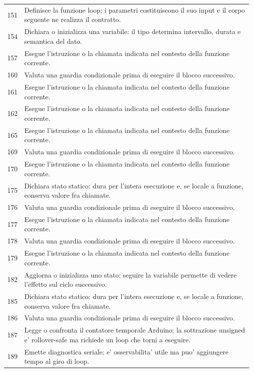 \documentclass[11pt,a4paper]{article}
\begin{document}
\begin{longtable}{p{}p{}}
151 & Definisce la funzione loop; i parametri costituiscono il suo input e il corpo seguente ne realizza il contratto. \\
154 & Dichiara o inizializza una variabile: il tipo determina intervallo, durata e semantica del dato. \\
157 & Esegue l'istruzione o la chiamata indicata nel contesto della funzione corrente. \\
160 & Valuta una guardia condizionale prima di eseguire il blocco successivo. \\
161 & Esegue l'istruzione o la chiamata indicata nel contesto della funzione corrente. \\
162 & Esegue l'istruzione o la chiamata indicata nel contesto della funzione corrente. \\
165 & Esegue l'istruzione o la chiamata indicata nel contesto della funzione corrente. \\
169 & Valuta una guardia condizionale prima di eseguire il blocco successivo. \\
170 & Esegue l'istruzione o la chiamata indicata nel contesto della funzione corrente. \\
175 & Dichiara stato statico: dura per l'intera esecuzione e, se locale a funzione, conserva valore fra chiamate. \\
176 & Valuta una guardia condizionale prima di eseguire il blocco successivo. \\
177 & Esegue l'istruzione o la chiamata indicata nel contesto della funzione corrente. \\
178 & Valuta una guardia condizionale prima di eseguire il blocco successivo. \\
179 & Esegue l'istruzione o la chiamata indicata nel contesto della funzione corrente. \\
182 & Aggiorna o inizializza uno stato; seguire la variabile permette di vedere l'effetto sul ciclo successivo. \\
185 & Dichiara stato statico: dura per l'intera esecuzione e, se locale a funzione, conserva valore fra chiamate. \\
186 & Valuta una guardia condizionale prima di eseguire il blocco successivo. \\
187 & Legge o confronta il contatore temporale Arduino; la sottrazione unsigned e' rollover-safe ma richiede un loop che torni a eseguire. \\
189 & Emette diagnostica seriale; e' osservabilita' utile ma puo' aggiungere tempo al giro di loop. \\

\end{longtable}
\end{document}
